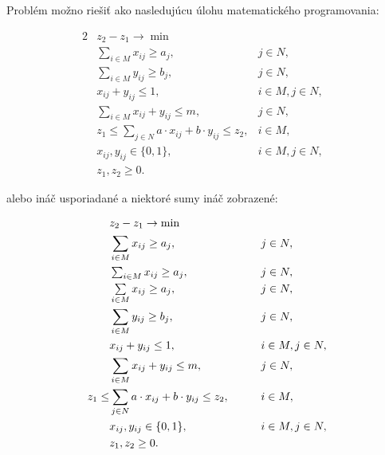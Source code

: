 Problém možno riešiť ako nasledujúcu úlohu matematického programovania:

\begin{alignat}{2} \label{u_1}
& z_2-z_1 \rightarrow \min             &                  &             \\
& \sum_{i\in M} x_{ij} \ge a_j,        &j\in N,           & \label{u_2} \\
& \sum_{i\in M} y_{ij} \ge b_j,        &j\in N,           & \label{u_3} \\
& x_{ij} + y_{ij} \le 1,               &i\in M, j\in N,   & \label{u_4} \\
& \sum_{i\in M} x_{ij}+ y_{ij} \le m,  &j\in N,           & \label{u_5} \\
& z_1 \le \sum_{j\in N} a\cdot x_{ij}+b\cdot y_{ij} \le z_2,  
                                       &i\in M,           & \label{u_6} \\
& x_{ij}, y_{ij} \in \{0,1\},          &i\in M, j\in N,   & \label{u_7} \\
& z_1, z_2 \ge 0.                      &                  & \label{u_8}
\end{alignat}

alebo ináč usporiadané a niektoré sumy ináč zobrazené:

\begin{alignat}{2} \label{u_1}
& z_2-z_1 \rightarrow \min             &&                               \allowdisplaybreaks\\
& \sum_{i\in M} x_{ij} \ge a_j,        &&j\in N,            \label{v_2} \allowdisplaybreaks\\
&\textstyle \sum_{i\in M} x_{ij} \ge a_j,          
                                       &&j\in N,            \nonumber   \allowdisplaybreaks\\
&\textstyle \sum\limits_{i\in M} x_{ij} \ge a_j,
                                       &&j\in N,            \nonumber   \allowdisplaybreaks\\
& \sum_{i\in M} y_{ij} \ge b_j,        &&j\in N,            \label{v_3} \allowdisplaybreaks\\
& x_{ij} + y_{ij} \le 1,               &&i\in M, j\in N,    \label{v_4} \allowdisplaybreaks\\
& \sum_{i\in M} x_{ij}+ y_{ij} \le m,  &&j\in N,            \label{v_5} \allowdisplaybreaks\\
z_1 \le &\sum_{j\in N} a\cdot x_{ij}+b\cdot y_{ij} \le z_2,\qquad  
                                       &&i\in M,            \label{v_6} \allowdisplaybreaks\\
& x_{ij}, y_{ij} \in \{0,1\},          &&i\in M, j\in N,    \label{v_7} \allowdisplaybreaks\\
& z_1, z_2 \ge 0.                      &&                   \label{v_8}
\end{alignat}



